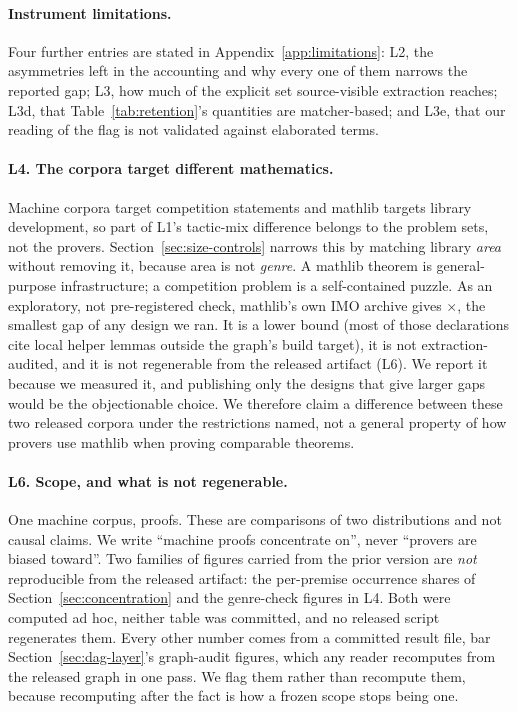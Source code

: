 \paragraph{Instrument limitations.} Four further entries are stated in
Appendix~\ref{app:limitations}: L2, the asymmetries left in the accounting and
why every one of them narrows the reported gap; L3, how much of the explicit set source-visible extraction reaches; L3d,
that Table~\ref{tab:retention}'s quantities are matcher-based; and L3e, that
our reading of the flag is not validated against elaborated terms.

\paragraph{L4. The corpora target different mathematics.} Machine corpora
target competition statements and mathlib targets library development, so part
of L1's tactic-mix difference belongs to the problem sets, not the provers.
Section~\ref{sec:size-controls} narrows this by matching library
\emph{area} without removing it, because area is not \emph{genre}. A mathlib
theorem is general-purpose infrastructure; a competition problem is a
self-contained puzzle. As an exploratory, not pre-registered check, mathlib's own IMO archive gives
\genreCheckRatio{}$\times$, the smallest gap of any design we ran. It is a
lower bound (most of those declarations cite local helper lemmas outside the
graph's build target), it is not extraction-audited, and it is not
regenerable from the released artifact (L6). We report it because we measured
it, and publishing only the designs that give larger gaps would be the
objectionable choice. We therefore claim a difference
between these two released corpora under the restrictions named, not a general
property of how provers use mathlib when proving comparable theorems.

\paragraph{L6. Scope, and what is not regenerable.} One machine corpus,
\machineProofs{} proofs. These are comparisons of two distributions and not
causal claims. We write ``machine proofs concentrate on'', never ``provers are
biased toward''. Two families of figures carried from the prior version are \emph{not}
reproducible from the released artifact: the per-premise occurrence shares of
Section~\ref{sec:concentration} and the genre-check figures in L4. Both were
computed ad hoc, neither table was
committed, and no released script regenerates them. Every other number comes from a committed result file, bar
Section~\ref{sec:dag-layer}'s graph-audit figures, which any reader recomputes
from the released graph in one pass. We flag them rather than recompute them,
because recomputing after the fact is how a frozen scope stops being one.
